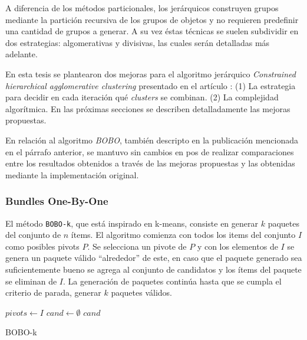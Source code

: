A diferencia de los métodos particionales, los jerárquicos construyen grupos mediante la partición recursiva de los grupos de objetos y no requieren predefinir una cantidad de grupos a generar. A su vez éstas técnicas se suelen subdividir en dos estrategias: algomerativas y divisivas, las cuales serán detalladas más adelante.

En esta tesis se plantearon dos mejoras para el algoritmo jerárquico \textit{Constrained hierarchical agglomerative clustering} presentado en el artículo \cite{journals/tkde/Amer-YahiaBCFMZ14}: (1) La estrategia para decidir en cada iteración qué \textit{clusters} se combinan. (2) La complejidad algorítmica. En las próximas secciones se describen detalladamente las mejoras propuestas.

En relación al algoritmo \textit{BOBO}, también descripto en la publicación mencionada en el párrafo anterior, se mantuvo sin cambios en pos de realizar comparaciones entre los resultados obtenidos a través de las mejoras propuestas y las obtenidas mediante la implementación original.

\subsubsection{Bundles One-By-One}
El método \texttt{BOBO-k}, que está inspirado en k-means, consiste en generar $k$ paquetes del conjunto de $n$ ítems. El algoritmo comienza con todos los items del conjunto $I$ como posibles pivots $P$. Se selecciona un pivote de $P$ y con los elementos de $I$ se genera un paquete válido ``alrededor'' de este, en caso que el paquete generado sea suficientemente bueno se agrega al conjunto de candidatos y los ítems del paquete se eliminan de $I$. La generación de paquetes continúa hasta que se cumpla el criterio de parada, generar $k$ paquetes válidos.

\begin{center}
	\begin{algorithm}[H]
	\DontPrintSemicolon
	\SetAlgoLined
		$pivots \leftarrow I$\;
		$cand \leftarrow \emptyset$\;
		\Return $cand$\;
	\caption{BOBO-k}\label{alg:bobo}
	\end{algorithm}
\end{center}

